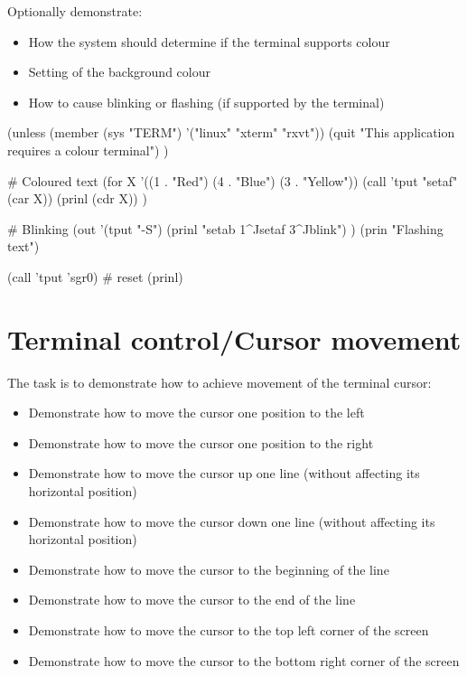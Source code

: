 Optionally demonstrate:

\begin{itemize}
\item
  How the system should determine if the terminal supports colour
\item
  Setting of the background colour
\item
  How to cause blinking or flashing (if supported by the terminal)
\end{itemize}


\begin{wideverbatim}

(unless (member (sys "TERM") '("linux" "xterm" "rxvt"))
   (quit "This application requires a colour terminal") )

# Coloured text
(for X '((1 . "Red") (4 . "Blue") (3 . "Yellow"))
   (call 'tput "setaf" (car X))
   (prinl (cdr X)) )

# Blinking
(out '(tput "-S")
   (prinl "setab 1^Jsetaf 3^Jblink") )
(prin "Flashing text")

(call 'tput 'sgr0)   # reset
(prinl)

\end{wideverbatim}

\pagebreak{}
\section*{Terminal control/Cursor movement}

The task is to demonstrate how to achieve movement of the terminal
cursor:

\begin{itemize}
\item
  Demonstrate how to move the cursor one position to the left
\item
  Demonstrate how to move the cursor one position to the right
\item
  Demonstrate how to move the cursor up one line (without affecting its
  horizontal position)
\item
  Demonstrate how to move the cursor down one line (without affecting
  its horizontal position)
\item
  Demonstrate how to move the cursor to the beginning of the line
\item
  Demonstrate how to move the cursor to the end of the line
\item
  Demonstrate how to move the cursor to the top left corner of the
  screen
\item
  Demonstrate how to move the cursor to the bottom right corner of the
  screen
\end{itemize}


